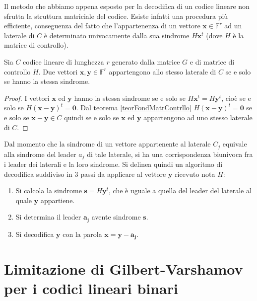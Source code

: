 Il metodo che abbiamo appena esposto per la decodifica di un codice lineare non sfrutta la struttura matriciale del codice. Esiste infatti una procedura più efficiente, conseguenza del fatto che l'appartenenza di un vettore $\mathbf{x} \in \mathbb{F}^{r}$ ad un laterale di $C$ è determinato univocamente dalla sua sindrome $H \mathbf{x}^{t}$ (dove $H$ è la matrice di controllo). 
\begin{teorema}
   Sia $C$ codice lineare di lunghezza $r$ generato dalla matrice $G$ e di matrice di controllo $H$. Due vettori $\mathbf{x}, \mathbf{y} \in \mathbb{F}^{r}$ appartengono allo stesso laterale di $C$ se e solo se hanno la stessa sindrome. 
\end{teorema}
\begin{proof}
   I vettori $\mathbf{x}$ ed $\mathbf{y}$ hanno la stessa sindrome se e solo se $H \mathbf{x}^{t} = H \mathbf{y}^{t}$, cioè se e solo se $H (\mathbf{x}-\mathbf{y})^{t} = \mathbf{0}$. Dal teorema \ref{teorFondMatrContrllo} $H (\mathbf{x}-\mathbf{y})^{t} = \mathbf{0}$ se e solo se $\mathbf{x}-\mathbf{y} \in C$ quindi se e solo se $\mathbf{x}$ ed $\mathbf{y}$ appartengono ad uno stesso laterale di $C$.
\end{proof}
\noindent
Dal momento che la sindrome di un vettore appartenente al laterale $C_{j}$ equivale alla sindrome del leader $a_{j}$ di tale laterale, si ha una corrispondenza biunivoca fra i leader dei laterali e la loro sindrome. Si delinea quindi un algoritmo di decodifica suddiviso in $3$ passi da applicare al vettore $\mathbf{y}$ ricevuto nota $H$:
\begin{enumerate}
   \item Si calcola la sindrome $\mathbf{s} = H \mathbf{y}^{t}$, che è uguale a quella del leader del laterale al quale $\mathbf{y}$ appartiene. 
   \item Si determina il leader $\mathbf{a_{j}}$ avente sindrome $\mathbf{s}$.
   \item Si decodifica $\mathbf{y}$ con la parola $\mathbf{x} = \mathbf{y} - \mathbf{a_{j}}$.
\end{enumerate}

\section{Limitazione di Gilbert-Varshamov per i codici lineari binari}

